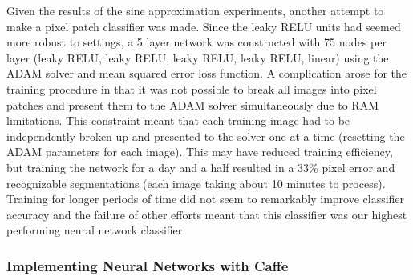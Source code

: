 \documentclass[12pt]{article}
\begin{document}
	Given the results of the sine approximation experiments, another attempt to make a pixel patch classifier was made.  Since the leaky RELU units had seemed more robust to settings, a 5 layer network was constructed with 75 nodes per layer (leaky RELU,  leaky RELU,  leaky RELU,  leaky RELU, linear) using the ADAM solver and mean squared error loss function.  A complication arose for the training procedure in that it was not possible to break all images into pixel patches and present them to the ADAM solver simultaneously due to RAM limitations.  This constraint meant that each training image had to be independently broken up and presented to the solver one at a time (resetting the ADAM parameters for each image).  This may have reduced training efficiency, but training the network for a day and a half resulted in a 33\% pixel error and recognizable segmentations (each image taking about 10 minutes to process).  Training for longer periods of time did not seem to remarkably improve classifier accuracy and the failure of other efforts meant that this classifier was our highest performing neural network classifier.

\subsubsection{Implementing Neural Networks with Caffe}
\end{document}
